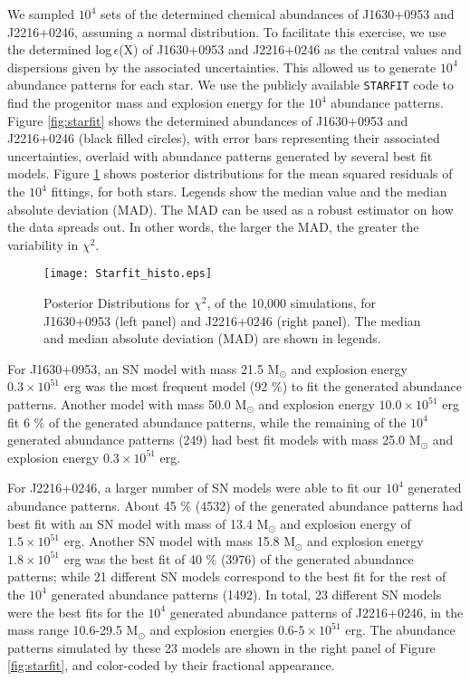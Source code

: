 We sampled $10^{4}$ sets of the determined chemical abundances of J1630+0953 and
J2216+0246, assuming a normal distribution. To facilitate this exercise, we use the
determined log\,$\epsilon$(X) of J1630+0953 and J2216+0246 as the central values
and dispersions given by the associated uncertainties. This allowed us to generate $10^{4}$  abundance patterns
for each star. We use the publicly available \texttt{STARFIT} code
\citep{2010ApJ...724..341H} to find the progenitor mass and explosion energy for
the $10^{4}$ abundance patterns. Figure \ref{fig:starfit}
shows the determined abundances of J1630+0953 and J2216+0246 (black filled
circles), with error bars representing their associated uncertainties,
overlaid with abundance patterns generated by several best fit models.
Figure  \ref{fig:Starfit_histo} shows posterior distributions for the mean
squared residuals of the $10^{4}$ fittings, for both stars. Legends show the
median value and the median absolute deviation (MAD). The MAD can be used as a
robust estimator on how the data spreads out. In other words, the larger the
MAD, the greater the variability in $\chi^{2}$.


\begin{figure}[!ht]
\centering
\texttt{[image: Starfit\_histo.eps]} 
\caption{Posterior Distributions for $\chi^{2}$, of the 10,000 simulations, for
J1630+0953 (left panel) and J2216+0246 (right panel). The median and median
absolute deviation (MAD) are shown in legends.}
\label{fig:Starfit_histo}
\end{figure}

For J1630+0953, an SN model with mass 21.5 M$_{\odot}$ and explosion energy $0.3
\times 10^{51}$ erg was the most frequent model (92 $\%$) to fit the generated
abundance patterns. Another model with mass 50.0 M$_{\odot}$ and explosion
energy $10.0  \times 10^{51}$ erg fit 6 $\%$ of the generated abundance
patterns, while the remaining of the $10^{4}$ generated abundance patterns (249)
had best fit models with mass 25.0 M$_{\odot}$ and explosion energy $0.3 \times
10^{51}$ erg. 

For J2216+0246, a larger number of SN models were able to fit our $10^{4}$
generated abundance patterns. About 45 $\%$ (4532) of the generated abundance
patterns had best fit with an SN model with mass of 13.4 M$_{\odot}$ and
explosion energy of $1.5 \times 10^{51}$ erg. Another SN model with mass 15.8
M$_{\odot}$ and explosion energy $1.8 \times 10^{51}$ erg was the best fit of 40
$\%$ (3976) of the generated abundance patterns; while 21 different SN models
correspond to the best fit for the rest of the $10^{4}$ generated abundance
patterns (1492). In total, 23 different SN models were the best fits for the
$10^{4}$ generated abundance patterns of J2216+0246, in the mass range 10.6-29.5
M$_{\odot}$ and explosion energies $0.6$-$5 \times 10^{51}$ erg. The abundance
patterns simulated by these 23 models are shown in the right panel of Figure
\ref{fig:starfit}, and color-coded by their fractional appearance.

